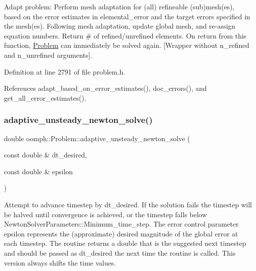 Adapt problem\+: Perform mesh adaptation for (all) refineable (sub)mesh(es), based on the error estimates in elemental\+\_\+error and the target errors specified in the mesh(es). Following mesh adaptation, update global mesh, and re-\/assign equation numbers. Return \# of refined/unrefined elements. On return from this function, \hyperlink{classoomph_1_1Problem}{Problem} can immediately be solved again. \mbox{[}Wrapper without n\+\_\+refined and n\+\_\+unrefined arguments\mbox{]}. 



Definition at line 2791 of file problem.\+h.



References adapt\+\_\+based\+\_\+on\+\_\+error\+\_\+estimates(), doc\+\_\+errors(), and get\+\_\+all\+\_\+error\+\_\+estimates().

\mbox{\label{classoomph_1_1Problem_abf6681f21f614ed7f15cc675ed6f692a}} 
\subsubsection{\texorpdfstring{adaptive\+\_\+unsteady\+\_\+newton\+\_\+solve()}{adaptive\_unsteady\_newton\_solve()}\hspace{0.1cm}{\footnotesize\ttfamily [1/2]}}
{\footnotesize\ttfamily double oomph\+::\+Problem\+::adaptive\+\_\+unsteady\+\_\+newton\+\_\+solve (\begin{DoxyParamCaption}\item[{const double \&}]{dt\+\_\+desired,  }\item[{const double \&}]{epsilon }\end{DoxyParamCaption})}



Attempt to advance timestep by dt\+\_\+desired. If the solution fails the timestep will be halved until convergence is achieved, or the timestep falls below Newton\+Solver\+Parameters\+::\+Minimum\+\_\+time\+\_\+step. The error control parameter epsilon represents the (approximate) desired magnitude of the global error at each timestep. The routine returns a double that is the suggested next timestep and should be passed as dt\+\_\+desired the next time the routine is called. This version always shifts the time values. 

